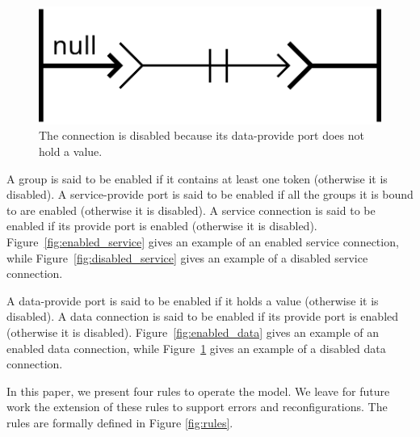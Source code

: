 \begin{figure}[t]
\begin{center}
  \includegraphics[width=0.4\columnwidth]{./images/disabled_data.pdf}
\end{center}
\caption{The connection is disabled because its data-provide port does not hold a value.}
\label{fig:disabled_data}
\end{figure}




A group is said to be enabled if it contains at least one token (otherwise
it is disabled). A service-provide port is said to be enabled if all the groups it
is bound to are enabled (otherwise it is disabled). A service connection is said to
be enabled if its provide port is enabled (otherwise it is disabled).
Figure~\ref{fig:enabled_service} gives an example of an enabled service connection,
while Figure~\ref{fig:disabled_service} gives an example of a disabled service connection.

A data-provide port is said to be enabled if it holds a value (otherwise it is disabled).
A data connection is said to be enabled if its provide port is enabled (otherwise it is
disabled).
Figure~\ref{fig:enabled_data} gives an example of an enabled data connection,
while Figure~\ref{fig:disabled_data} gives an example of a disabled data connection.
    
In this paper, we present four rules to operate the \mad model. We
leave for future work the extension of these rules to support errors
and reconfigurations. The rules are formally defined in
Figure \ref{fig:rules}.

